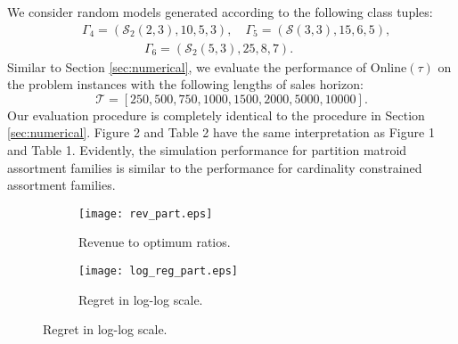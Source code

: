 \documentclass{article}
\theoremstyle{definition}
\newcommand{\SSS}{\mathcal{S}}
\newcommand{\TTT}{\mathcal{T}}
\begin{document}
We consider random models generated according to the following class tuples:
\begin{align*}
&\Gamma_4 = (\SSS_2(2, 3), 10, 5, 3), \quad \Gamma_5 = (\SSS(3, 3), 15, 6, 5), \\
&\qquad \qquad \quad \Gamma_6 = (\SSS_2(5, 3), 25, 8, 7).
\end{align*}
Similar to Section \ref{sec:numerical}, we evaluate the performance of {\sc Online}$(\tau)$ on the problem instances with the following lengths of sales horizon:
\begin{equation*}
\TTT = [250, 500, 750, 1000, 1500, 2000, 5000, 10000].
\end{equation*}
Our evaluation procedure is completely identical to the procedure in Section \ref{sec:numerical}. Figure 2 and Table 2 have the same interpretation as Figure 1 and Table 1. Evidently, the simulation performance for partition matroid assortment families is similar to the performance for cardinality constrained assortment families.

\begin{figure}[t]
\vspace{-0.2cm}
\hspace{-0.6cm}
\centering
\begin{subfigure}[b]{0.26\textwidth}
\texttt{[image: rev\_part.eps]}
\caption{Revenue to optimum ratios.}
\label{fig:part-ratio}
\end{subfigure}
\hspace{-0.6cm}
\begin{subfigure}[b]{0.26\textwidth}
\texttt{[image: log\_reg\_part.eps]}
\caption{Regret in log-log scale.}\label{fig:part-regret}
\end{subfigure}
\hspace{-0.6cm}
\vspace{-0.2cm}
\end{figure}
\end{document}

